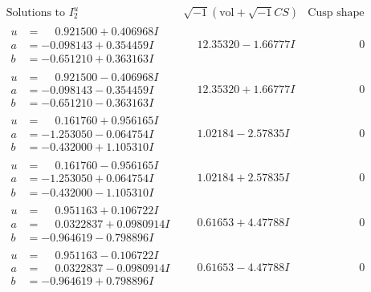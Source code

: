 \documentclass[1p]{elsarticle_modified}
\theoremstyle{definition}
\newcommand{\I}{\sqrt{-1}}
\begin{document}
$$\begin{array}{c|c|c}  
\text{Solutions to }I^u_{2}& \I (\text{vol} + \sqrt{-1}CS) & \text{Cusp shape}\\
 \hline 
\begin{aligned}
u &= \phantom{-}0.921500 + 0.406968 I \\
a &= -0.098143 + 0.354459 I \\
b &= -0.651210 + 0.363163 I\end{aligned}
 & \phantom{-}12.35320 - 1.66777 I & \phantom{-0.000000 } 0 \\ \hline\begin{aligned}
u &= \phantom{-}0.921500 - 0.406968 I \\
a &= -0.098143 - 0.354459 I \\
b &= -0.651210 - 0.363163 I\end{aligned}
 & \phantom{-}12.35320 + 1.66777 I & \phantom{-0.000000 } 0 \\ \hline\begin{aligned}
u &= \phantom{-}0.161760 + 0.956165 I \\
a &= -1.253050 - 0.064754 I \\
b &= -0.432000 + 1.105310 I\end{aligned}
 & \phantom{-}1.02184 - 2.57835 I & \phantom{-0.000000 } 0 \\ \hline\begin{aligned}
u &= \phantom{-}0.161760 - 0.956165 I \\
a &= -1.253050 + 0.064754 I \\
b &= -0.432000 - 1.105310 I\end{aligned}
 & \phantom{-}1.02184 + 2.57835 I & \phantom{-0.000000 } 0 \\ \hline\begin{aligned}
u &= \phantom{-}0.951163 + 0.106722 I \\
a &= \phantom{-}0.0322837 + 0.0980914 I \\
b &= -0.964619 - 0.798896 I\end{aligned}
 & \phantom{-}0.61653 + 4.47788 I & \phantom{-0.000000 } 0 \\ \hline\begin{aligned}
u &= \phantom{-}0.951163 - 0.106722 I \\
a &= \phantom{-}0.0322837 - 0.0980914 I \\
b &= -0.964619 + 0.798896 I\end{aligned}
 & \phantom{-}0.61653 - 4.47788 I & \phantom{-0.000000 } 0 \\ \hline\begin{aligned}

\end{aligned}
\end{array}$$
\end{document}
